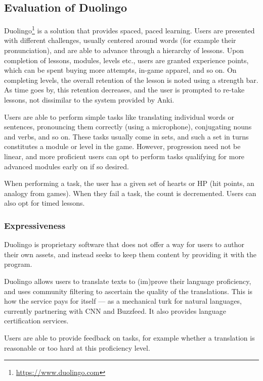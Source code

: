 \subsection{Evaluation of Duolingo}

Duolingo\footnote{\url{https://www.duolingo.com}} is a solution that provides 
spaced, paced learning. Users are presented with different challenges, usually 
centered around words (for example their pronunciation), and are able to 
advance through a hierarchy of lessons. Upon completion of lessons, modules, 
levels etc., users are granted experience points, which can be spent buying 
more attempts, in-game apparel, and so on. On completing levels, the overall 
retention of the lesson is noted using a strength bar. As time goes by, this 
retention decreases, and the user is prompted to re-take lessons, not 
dissimilar to the system provided by Anki.

Users are able to perform simple tasks like translating individual words or
sentences, pronouncing them correctly (using a microphone), conjugating nouns
and verbs, and so on. These tasks usually come in sets, and such a set in 
turns constitutes a module or level in the game. However, progression need not 
be linear, and more proficient users can opt to perform tasks qualifying for 
more advanced modules early on if so desired.

When performing a task, the user has a given set of hearts or HP (hit points, 
an analogy from games). When they fail a task, the count is decremented. Users 
can also opt for timed lessons.

\subsubsection{Expressiveness}

Duolingo is proprietary software that does not offer a way for users to author 
their own assets, and instead seeks to keep them content by providing it with 
the program.

Duolingo allows users to translate texts to (im)prove their language
proficiency, and uses community filtering to ascertain the quality of the
translations. This is how the service pays for itself --- as a mechanical 
turk for natural languages, currently partnering with CNN and
Buzzfeed\cite{duolingobuzz}. It also provides language certification
services\cite{duolingocert}.

Users are able to provide feedback on tasks, for example whether a translation
is reasonable or too hard at this proficiency level.

